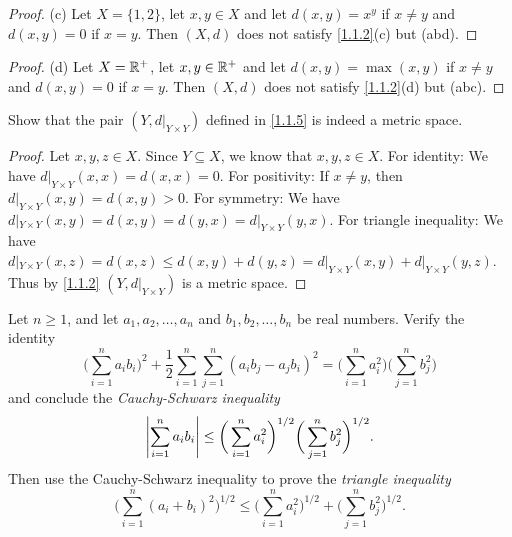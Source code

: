\begin{proof}{(c)}
  Let \(X = \{1, 2\}\), let \(x, y \in X\) and let \(d(x, y) = x^y\) if \(x \neq y\) and \(d(x, y) = 0\) if \(x = y\).
  Then \((X, d)\) does not satisfy \cref{1.1.2}(c) but (abd).
\end{proof}

\begin{proof}{(d)}
  Let \(X = \mathbb{R}^+\), let \(x, y \in \mathbb{R}^+\) and let \(d(x, y) = \max(x, y)\) if \(x \neq y\) and \(d(x, y) = 0\) if \(x = y\).
  Then \((X, d)\) does not satisfy \cref{1.1.2}(d) but (abc).
\end{proof}

\begin{ex}\label{ex:1.1.4}
  Show that the pair \((Y, d|_{Y \times Y})\) defined in \cref{1.1.5} is indeed a metric space.
\end{ex}

\begin{proof}
  Let \(x, y, z \in X\).
  Since \(Y \subseteq X\), we know that \(x, y, z \in X\).
  For identity:
  We have \(d|_{Y \times Y}(x, x) = d(x, x) = 0\).
  For positivity:
  If \(x \neq y\), then \(d|_{Y \times Y}(x, y) = d(x, y) > 0\).
  For symmetry:
  We have \(d|_{Y \times Y}(x, y) = d(x, y) = d(y, x) = d|_{Y \times Y}(y, x)\).
  For triangle inequality:
  We have \(d|_{Y \times Y}(x, z) = d(x, z) \leq d(x, y) + d(y, z) = d|_{Y \times Y}(x, y) + d|_{Y \times Y}(y, z)\).
  Thus by \cref{1.1.2} \((Y, d|_{Y \times Y})\) is a metric space.
\end{proof}

\begin{ex}\label{ex:1.1.5}
  Let \(n \geq 1\), and let \(a_1, a_2, \dots, a_n\) and \(b_1, b_2, \dots, b_n\) be real numbers.
  Verify the identity
  \[
    \bigg(\sum_{i = 1}^n a_i b_i\bigg)^2 + \dfrac{1}{2} \sum_{i = 1}^n \sum_{j = 1}^n (a_i b_j - a_j b_i)^2 = \bigg(\sum_{i = 1}^n a_i^2\bigg) \bigg(\sum_{j = 1}^n b_j^2\bigg)
  \]
  and conclude the \emph{Cauchy-Schwarz inequality}
  \[
    \left\lvert\sum_{i = 1}^n a_i b_i\right\rvert \leq \bigg(\sum_{i = 1}^n a_i^2\bigg)^{1 / 2} \bigg(\sum_{j = 1}^n b_j^2\bigg)^{1 / 2}.
  \]
  Then use the Cauchy-Schwarz inequality to prove the \emph{triangle inequality}
  \[
    \bigg(\sum_{i = 1}^n (a_i + b_i)^2\bigg)^{1 / 2} \leq \bigg(\sum_{i = 1}^n a_i^2\bigg)^{1 / 2} + \bigg(\sum_{j = 1}^n b_j^2\bigg)^{1 / 2}.
  \]
\end{ex}

